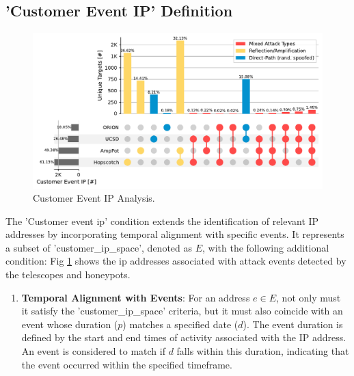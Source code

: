 \subsection*{'Customer Event IP' Definition}
\begin{figure}[htbp]
    \centering
    \includegraphics[scale=0.4]{graphs/space_event.pdf}
    \caption{Customer Event IP Analysis.}
    \label{fig:customereventip}
    \end{figure}
The 'Customer event ip' condition extends the identification of relevant IP addresses by incorporating temporal alignment with specific events. It represents a subset of 'customer\_ip\_space', denoted as $E$, with the following additional condition:
Fig \ref{fig:customereventip} shows the ip addresses associated with attack events detected by the telescopes and honeypots.
\begin{enumerate}
    \item \textbf{Temporal Alignment with Events}: For an address $e \in E$, not only must it satisfy the 'customer\_ip\_space' criteria, but it must also coincide with an event whose duration ($p$) matches a specified date ($d$). The event duration is defined by the start and end times of activity associated with the IP address. An event is considered to match if $d$ falls within this duration, indicating that the event occurred within the specified timeframe.
\end{enumerate}








